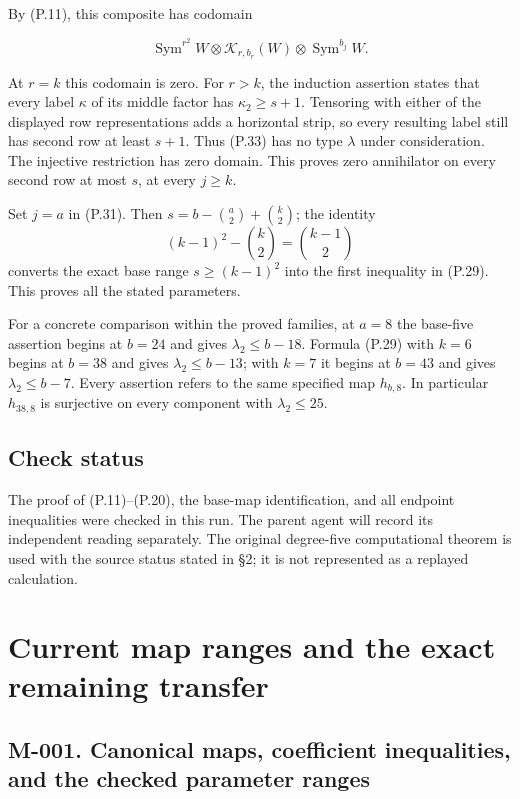 \documentclass[
  10pt,
]{article}
\begin{document}
By (P.11), this composite has codomain

\[
\operatorname{Sym}^{r^2}W\otimes
\mathcal K_{r,b_r}(W)\otimes\operatorname{Sym}^{b_j}W.
\tag{P.33}
\]

At \(r=k\) this codomain is zero. For \(r>k\), the induction assertion
states that every label \(\kappa\) of its middle factor has
\(\kappa_2\ge s+1\). Tensoring with either of the displayed row
representations adds a horizontal strip, so every resulting label still
has second row at least \(s+1\). Thus (P.33) has no type \(\lambda\)
under consideration. The injective restriction has zero domain. This
proves zero annihilator on every second row at most \(s\), at every
\(j\ge k\).

Set \(j=a\) in (P.31). Then \(s=b-\binom a2+\binom k2\); the identity \[
(k-1)^2-\binom k2=\binom{k-1}{2}
\tag{P.34}
\] converts the exact base range \(s\ge(k-1)^2\) into the first
inequality in (P.29). This proves all the stated parameters.

For a concrete comparison within the proved families, at \(a=8\) the
base-five assertion begins at \(b=24\) and gives \(\lambda_2\le b-18\).
Formula (P.29) with \(k=6\) begins at \(b=38\) and gives
\(\lambda_2\le b-13\); with \(k=7\) it begins at \(b=43\) and gives
\(\lambda_2\le b-7\). Every assertion refers to the same specified map
\(h_{b,8}\). In particular \(h_{38,8}\) is surjective on every component
with \(\lambda_2\le25\).

\subsection{Check status}\label{check-status}

The proof of (P.11)--(P.20), the base-map identification, and all
endpoint inequalities were checked in this run. The parent agent will
record its independent reading separately. The original degree-five
computational theorem is used with the source status stated in §2; it is
not represented as a replayed calculation.

\section{Current map ranges and the exact remaining
transfer}\label{current-map-ranges-and-the-exact-remaining-transfer}

\subsection{M-001. Canonical maps, coefficient inequalities, and the
checked parameter
ranges}\label{m-001.-canonical-maps-coefficient-inequalities-and-the-checked-parameter-ranges}
\end{document}
